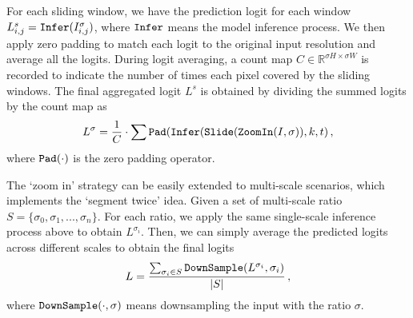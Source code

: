 For each sliding window, we have the prediction logit for each window $L_{i,j}^s={\tt{Infer}}(I_{i,j}^{\sigma})$, where ${\tt{Infer}}$ means the model inference process. We then apply zero padding to match each logit to the original input resolution and average all the logits. During logit averaging, a count map $C\in \mathbb{R}^{\sigma H\times \sigma W}$ is recorded to %
indicate the number of times each pixel covered by the sliding windows. The final aggregated logit $L^{s}$ is obtained by dividing the summed logits by the count map as
\begin{equation}
     L^{\sigma} 
     =\frac{1}{C}\cdot \sum {\tt Pad}({\tt Infer}({\tt Slide}({\tt ZoomIn}(I,\sigma)), k, t)\,,
\end{equation}
where ${\tt Pad}(\cdot)$ is the zero padding operator. %

The `zoom in' strategy can be easily extended to multi-scale scenarios, which implements the `segment twice' idea.
Given a set of multi-scale ratio $S=\{\sigma_0,\sigma_1,...,\sigma_n\}$. For each ratio, we apply the same single-scale inference process above to obtain $L^{\sigma_i}$.
Then, we can simply average the predicted logits across different scales to obtain the final logits
\begin{equation}
    L=\frac{\sum_{\sigma_i \in S}{\tt{DownSample}}(L^{\sigma_i}, \sigma_i)}{|S|}\,,
\end{equation}
where ${\tt{DownSample}(\cdot, \sigma)}$ means downsampling the input with the ratio $\sigma$.


\begin{table}[!t]
    \centering
    \renewcommand{\arraystretch}{1.5}
    \addtolength{\tabcolsep}{-1pt}
    \caption{\textbf{Ablation of different stages during the development phase}.}
    \label{tab:ablation}
\end{table}